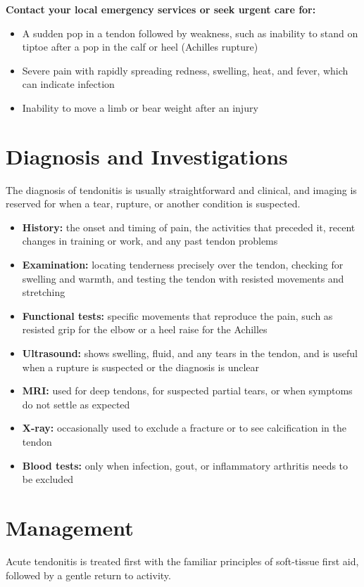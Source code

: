 \textbf{Contact your local emergency services or seek urgent care for:}
\begin{itemize}
    \item A sudden pop in a tendon followed by weakness, such as inability to stand on tiptoe after a pop in the calf or heel (Achilles rupture)
    \item Severe pain with rapidly spreading redness, swelling, heat, and fever, which can indicate infection
    \item Inability to move a limb or bear weight after an injury
\end{itemize}

\section*{Diagnosis and Investigations}
The diagnosis of tendonitis is usually straightforward and clinical, and imaging is reserved for when a tear, rupture, or another condition is suspected.

\begin{itemize}
    \item \textbf{History:} the onset and timing of pain, the activities that preceded it, recent changes in training or work, and any past tendon problems
    \item \textbf{Examination:} locating tenderness precisely over the tendon, checking for swelling and warmth, and testing the tendon with resisted movements and stretching
    \item \textbf{Functional tests:} specific movements that reproduce the pain, such as resisted grip for the elbow or a heel raise for the Achilles
    \item \textbf{Ultrasound:} shows swelling, fluid, and any tears in the tendon, and is useful when a rupture is suspected or the diagnosis is unclear
    \item \textbf{MRI:} used for deep tendons, for suspected partial tears, or when symptoms do not settle as expected
    \item \textbf{X-ray:} occasionally used to exclude a fracture or to see calcification in the tendon
    \item \textbf{Blood tests:} only when infection, gout, or inflammatory arthritis needs to be excluded
\end{itemize}

\section*{Management}
Acute tendonitis is treated first with the familiar principles of soft-tissue first aid, followed by a gentle return to activity.

